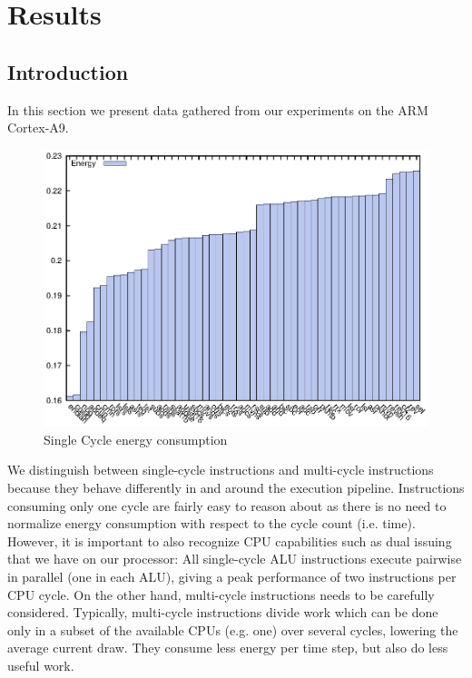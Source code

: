 \section{Results}

\subsection{Introduction}
In this section we present data gathered from our experiments on the ARM
Cortex-A9.

\begin{figure}[ht]
    \centering
    \includegraphics[width=\textwidth]{figures/cycle_timings_1_cycles_normalized}
    \caption{Single Cycle energy consumption}
    \label{fig:singlecycle}
\end{figure}


We distinguish between single-cycle instructions and multi-cycle instructions
because they behave differently in and around the execution pipeline.
Instructions consuming only one cycle are fairly easy to reason about as there
is no need to normalize energy consumption with respect to the cycle count (i.e.
time). However, it is important to also recognize CPU capabilities such as dual
issuing that we have on our processor: All single-cycle ALU instructions execute
pairwise in parallel (one in each ALU), giving a peak performance of two
instructions per CPU cycle. On the other hand, multi-cycle instructions needs to
be carefully considered. Typically, multi-cycle instructions divide work which
can be done only in a subset of the available CPUs (e.g. one) over several
cycles, lowering the average current draw. They consume less energy per
time step, but also do less useful work.

